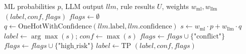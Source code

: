 \begin{algorithm}[t]
\caption{FuseEvidence}
\label{alg:fusion}
\scriptsize
\begin{algorithmic}[1]
\REQUIRE ML probabilities $p$, LLM output $llm$, rule results $U$, weights $w_{\text{ml}}, w_{\text{llm}}$
\ENSURE $(label, conf, flags)$
\STATE $flags \leftarrow \emptyset$
\STATE $q \leftarrow \text{OneHotWithConfidence}(llm.\text{label}, llm.\text{confidence})$
\STATE $s \leftarrow w_{\text{ml}} \cdot p + w_{\text{llm}} \cdot q$
\STATE $label \leftarrow \arg\max(s)$; $conf \leftarrow \max(s)$
 \STATE $flags \leftarrow flags \cup \{\text{"conflict"}\}$ \ENDIF
{}
    \STATE $flags \leftarrow flags \cup \{\text{"high\_risk"}\}$
     \STATE $label \leftarrow \text{TP}$ \ENDIF
\ENDIF
\RETURN $(label, conf, flags)$
\end{algorithmic}
\end{algorithm}
